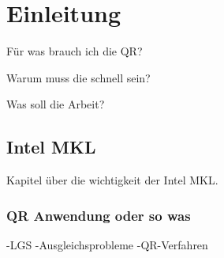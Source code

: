 \chapter{Einleitung}

Für was brauch ich die QR?

Warum muss die schnell sein?

Was soll die Arbeit?

\section{Intel MKL}

Kapitel über die wichtigkeit der Intel MKL.

\subsection{QR Anwendung oder so was}
-LGS 
-Ausgleichsprobleme 
-QR-Verfahren 